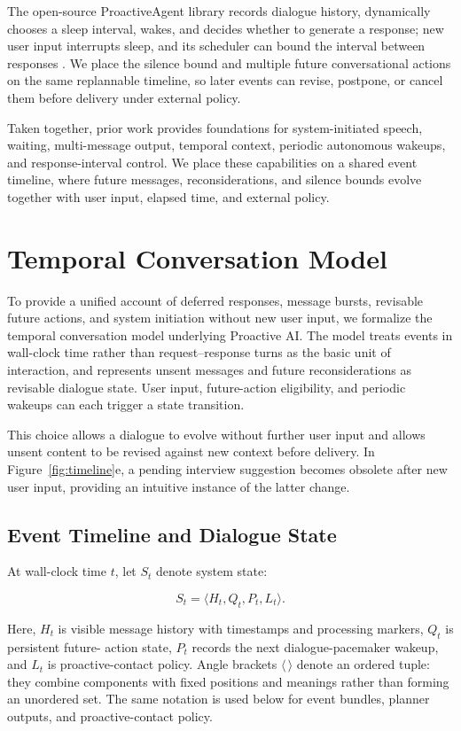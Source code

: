 \documentclass[manuscript,nonacm]{acmart}
\begin{document}
The open-source ProactiveAgent library records dialogue history, dynamically
chooses a sleep interval, wakes, and decides whether to generate a response; new
user input interrupts sleep, and its scheduler can bound the interval between
responses \cite{mariga2024proactiveagent}. We place the silence bound and multiple
future conversational actions on the same replannable timeline, so later events
can revise, postpone, or cancel them before delivery under external policy.

Taken together, prior work provides foundations for system-initiated speech,
waiting, multi-message output, temporal context, periodic autonomous wakeups,
and response-interval control. We place these capabilities on a shared event
timeline, where future messages, reconsiderations, and silence bounds evolve
together with user input, elapsed time, and external policy.

\section{Temporal Conversation Model}

To provide a unified account of deferred responses, message bursts, revisable
future actions, and system initiation without new user input, we formalize the
temporal conversation model underlying Proactive AI. The model treats events in wall-clock time rather
than request--response turns as the basic unit of interaction, and represents
unsent messages and future reconsiderations as revisable dialogue state. User
input, future-action eligibility, and periodic wakeups can each trigger a state
transition.

This choice allows a dialogue to evolve without further user input and allows
unsent content to be revised against new context before delivery. In
Figure~\ref{fig:timeline}e, a pending interview suggestion becomes obsolete
after new user input, providing an intuitive instance of the latter change.

\subsection{Event Timeline and Dialogue State}

At wall-clock time $t$, let $S_t$ denote system state:

\begin{equation}
S_t=\langle H_t,Q_t,P_t,L_t\rangle.
\end{equation}

Here, $H_t$ is visible message history with timestamps and processing markers, $Q_t$ is persistent future-
action state, $P_t$ records the next dialogue-pacemaker wakeup, and $L_t$ is
proactive-contact policy. Angle brackets $\langle\,\rangle$ denote an ordered
tuple: they combine components with fixed positions and meanings rather than
forming an unordered set. The same notation is used below for event bundles,
planner outputs, and proactive-contact policy.
\end{document}

